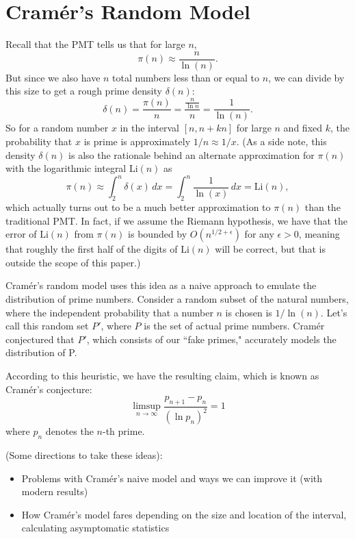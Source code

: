 \documentclass[conference]{IEEEtran}
\begin{document}
\section{Cram\'er's Random Model}
Recall that the PMT tells us that for large $n$,
\[\pi(n) \approx \frac{n}{\ln(n)}.\]
But since we also have $n$ total numbers less than or equal to
$n$, we can divide by this size to get a rough prime density
$\delta(n)$:
\[\delta(n) = \frac{\pi(n)}{n} = \frac{\frac{n}{\ln{n}}}{n} = \frac{1}{\ln(n)}.\]
So for a random number $x$ in the interval $[n, n + kn]$ for
large $n$ and fixed $k$, the probability that $x$ is prime is
approximately $1 / n \approx 1 / x$. (As a side note, this
density $\delta(n)$ is also the rationale behind an alternate
approximation for $\pi(n)$ with the logarithmic integral
$\text{Li}(n)$ as
\[\pi(n) \approx \int_2^{n} \delta(x)\, dx = \int_2^{n} \frac{1}{\ln(x)}\, dx = \text{Li}(n),\]
which actually turns out to be a much better approximation to
$\pi(n)$ than the traditional PMT. In fact, if we assume the
Riemann hypothesis, we have that the error of $\text{Li}(n)$ from
$\pi(n)$ is bounded by $O(n^{1/2 + \epsilon})$ for any
$\epsilon > 0$, meaning that roughly the first half of the
digits of
$\text{Li}(n)$ will be correct,
but that is outside the scope of this paper.)


Cram\'er's random model uses this idea as a naive approach to emulate the distribution of prime numbers. Consider a random subset of the natural numbers, where the independent probability that a number $n$ is chosen is $1 / \ln(n)$. Let's call this random set $P'$, where $P$ is the set of actual prime numbers. Cram\'er conjectured that $P'$, which consists of our ``fake primes," accurately models the distribution of P. 

According to this heuristic, we have the resulting claim, which is known as Cram\'er's conjecture:
\[\limsup_{n \to \infty} \frac{p_{n + 1} - p_n}{(\ln p_n)^2} = 1\]
where $p_n$ denotes the $n$-th prime.

(Some directions to take these ideas):
\begin{itemize}
  \item Problems with Cram\'er's naive model and ways we can improve it (with modern results)
  \item How Cram\'er's model fares depending on the size and location of the interval, calculating asymptomatic statistics
\end{itemize}
\end{document}
